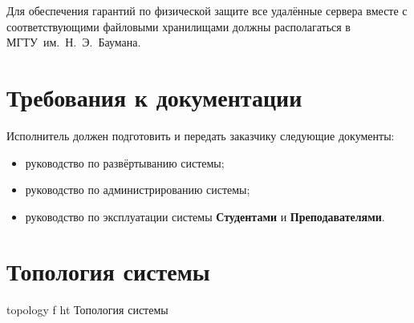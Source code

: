 \documentclass{bmstu}
\begin{document}
  Для обеспечения гарантий по физической защите все удалённые сервера вместе с соответствующими файловыми хранилищами должны располагаться в МГТУ~им.~Н.~Э.~Баумана.

  \section{Требования к документации}

  Исполнитель должен подготовить и передать заказчику следующие
  документы:
  \begin{itemize}[label=---]
    \item руководство по развёртыванию системы;
    \item руководство по администрированию системы;
    \item руководство по эксплуатации системы \textbf{Студентами} и
      \textbf{Преподавателями}.
  \end{itemize}

  \section{Топология системы}

    {topology}
    {f}
    {ht}
    {\textwidth}
    {Топология системы}

  \FloatBarrier
  
%
%
%
\end{document}
